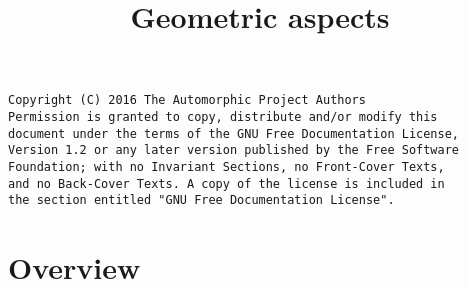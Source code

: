 

%

\newcommand{\TAG}{ZZZZ}

\title{Geometric aspects}


\maketitle

\label{section-phantom}
\hypertarget{0900}{}
\reversemarginpar{}

\begin{verbatim}
Copyright (C) 2016 The Automorphic Project Authors
Permission is granted to copy, distribute and/or modify this
document under the terms of the GNU Free Documentation License,
Version 1.2 or any later version published by the Free Software
Foundation; with no Invariant Sections, no Front-Cover Texts,
and no Back-Cover Texts. A copy of the license is included in
the section entitled "GNU Free Documentation License".
\end{verbatim}

\tableofcontents


\section{Overview}
\label{section-overview}
\hypertarget{0901}{}
\reversemarginpar{}

\noindent








